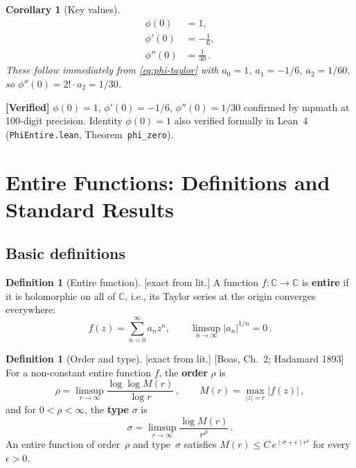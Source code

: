 \documentclass[12pt,a4paper]{article}
\newtheorem{corollary}[proposition]{Corollary}
\theoremstyle{definition}
\newtheorem{definition}[proposition]{Definition}
\theoremstyle{remark}
\newcommand{\fromlit}[1]{\textcolor{blue!70!black}{\textsf{[#1]}}}
\newcommand{\exactlit}{\textcolor{blue!60!black}{\textsf{[exact from lit.]}}}
\newcommand{\verified}[1]{%
  \par\smallskip\noindent
  \colorbox{green!10}{\parbox{\dimexpr\linewidth-2\fboxsep}{%
    \textcolor{green!50!black}{\textbf{[Verified]}} #1}}%
  \par\smallskip}
\begin{document}
\begin{corollary}[Key values]
\label{cor:phi-values}
\begin{align}
  \phi(0) &= 1, \label{eq:phi0}\\
  \phi'(0) &= -\frac{1}{6},\label{eq:phi-prime0}\\
  \phi''(0) &= \frac{1}{30}\label{eq:phi-double-prime0}\,.
\end{align}
These follow immediately from \eqref{eq:phi-taylor} with
$a_0 = 1$, $a_1 = -1/6$, $a_2 = 1/60$, so
$\phi''(0) = 2!\cdot a_2 = 1/30$.
\end{corollary}

\verified{$\phi(0)=1$, $\phi'(0)=-1/6$, $\phi''(0)=1/30$
confirmed by mpmath at 100-digit precision.  Identity
$\phi(0)=1$ also verified formally in Lean~4
(\texttt{PhiEntire.lean}, Theorem~\texttt{phi\_zero}).}


\section{Entire Functions: Definitions and Standard Results}
\label{sec:entire-theory}

\subsection{Basic definitions}

\begin{definition}[Entire function]
\label{def:entire}
\exactlit\;
A function $f:\mathbb{C}\to\mathbb{C}$ is \textbf{entire} if it is
holomorphic on all of $\mathbb{C}$, i.e., its Taylor series at the
origin converges everywhere:
\begin{equation}
  f(z) = \sum_{n=0}^\infty a_n z^n,
  \qquad \limsup_{n\to\infty} |a_n|^{1/n} = 0\,.
\end{equation}
\end{definition}

\begin{definition}[Order and type]
\label{def:order-type}
\exactlit\;
\fromlit{Boas, Ch.~2; Hadamard 1893}
For a non-constant entire function $f$, the \textbf{order} $\rho$ is
\begin{equation}
  \rho = \limsup_{r\to\infty}
  \frac{\log\log M(r)}{\log r}\,,
  \qquad M(r) = \max_{|z|=r}|f(z)|\,,
  \label{eq:order}
\end{equation}
and for $0 < \rho < \infty$, the \textbf{type} $\sigma$ is
\begin{equation}
  \sigma = \limsup_{r\to\infty}
  \frac{\log M(r)}{r^\rho}\,.
  \label{eq:type}
\end{equation}
An entire function of order~$\rho$ and type~$\sigma$ satisfies
$M(r) \leq C\, e^{(\sigma+\epsilon)r^\rho}$ for every $\epsilon > 0$.
\end{definition}
\end{document}
